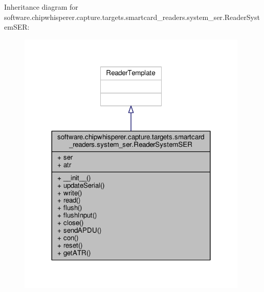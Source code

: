 Inheritance diagram for software.\+chipwhisperer.\+capture.\+targets.\+smartcard\+\_\+readers.\+system\+\_\+ser.\+Reader\+System\+S\+E\+R\+:\nopagebreak
\begin{figure}[H]
\begin{center}
\leavevmode
\includegraphics[width=312pt]{d8/d7c/classsoftware_1_1chipwhisperer_1_1capture_1_1targets_1_1smartcard__readers_1_1system__ser_1_1ReaderSystemSER__inherit__graph}
\end{center}
\end{figure}


